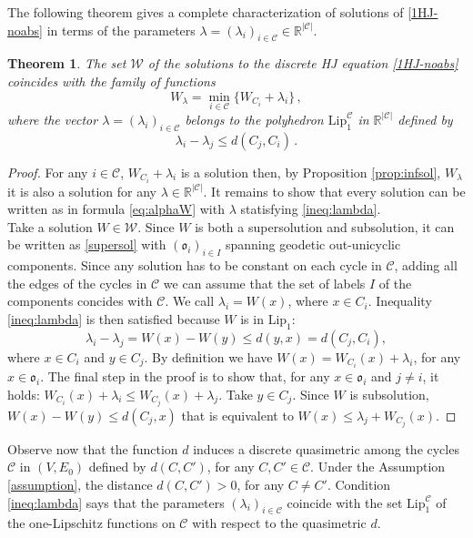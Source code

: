 \documentclass[reqno]{amsart}
\theoremstyle{plain}
\newtheorem{theorem}{Theorem}[section]
\theoremstyle{definition}
\theoremstyle{remark}
\numberwithin{equation}{section}
\numberwithin{theorem}{section}
\newcommand{\<}{\langle}
\renewcommand{\>}{\rangle}
\begin{document}
The following theorem gives a complete characterization of solutions of \eqref{1HJ-noabs} in terms of the parameters $\lambda=(\lambda_i)_{i\in \mathcal C}\in \mathbb R^{|\mathcal{C}|}$.
\begin{theorem}\label{teo:char_alpha}
	The set $\mathcal W$ of the solutions to the discrete HJ equation \eqref{1HJ-noabs} coincides with the family of functions 
	\begin{equation}\label{eq:alphaW}
		W_\lambda=\min_{i\in\mathcal{C}}\Big\{W_{C_i}+\lambda_i\Big\}\,, 
	\end{equation}
	where the vector $\lambda=(\lambda_i)_{i\in\mathcal{C}}$ belongs to the polyhedron $\mathrm{Lip}_1^{\mathcal{C}}$ in $\mathbb{R}^{|\mathcal{C}|}$ defined by
	\begin{equation}\label{ineq:lambda}
		\lambda_i-\lambda_j\leq d(C_j,C_i)\,.
	\end{equation}
\end{theorem}



\begin{proof} 
	For any $i\in\mathcal{C}$, $W_{C_i}+\lambda_i$ is a solution then, by Proposition \ref{prop:infsol}, $W_\lambda$ it is also a solution for any $\lambda\in\mathbb{R}^{|\mathcal{C}|}$. It remains to show that every solution can be written as in formula \eqref{eq:alphaW} with $\lambda$ statisfying \eqref{ineq:lambda}.\\
	
	Take a solution $W\in\mathcal{W}$. Since $W$ is both a supersolution and subsolution, it can be written as \eqref{supersol} with $(\mathfrak{o}_i)_{i\in I}$ spanning geodetic out-unicyclic components. Since any solution has to be constant on each cycle in $\mathcal C$, adding all the edges of the cycles in $\mathcal C$ we can assume that the set of labels $I$ of the components concides with $\mathcal C$. We call $\lambda_i = W (x)$, where $x\in C_i$. Inequality \eqref{ineq:lambda} is then satisfied because $W$ is in $\mathrm{Lip}_1$:
	\begin{equation*}
		\lambda_i-\lambda_j=W(x)-W(y)\leq d(y,x)=d(C_j,C_i),
	\end{equation*}
	where $x\in C_i$ and $y\in C_j$. By definition we have $W(x)=W_{C_i}(x)+\lambda_i$, for any $x\in\mathfrak{o}_i$. The final step in the proof is to show that,  for any $x\in\mathfrak{o}_i$ and $j\neq i$, it holds:
	$W_{C_i}(x)+\lambda_i\leq W_{C_j}(x)+\lambda_j$. Take $y\in C_j$. Since $W$ is subsolution, $W(x)-W(y)\leq d(C_j,x)$ that is equivalent to $W(x)\leq \lambda_j + W_{C_j}(x)$.
	
	
\end{proof}
Observe now that the function $d$ induces a discrete quasimetric among the cycles $\mathcal{C}$ in $(V,E_0)$ defined by $d(C,C')$, for any $C,C'\in\mathcal{C}$.  
Under the Assumption \ref{assumption}, the distance $d(C,C')>0$, for any $C\neq C'$. Condition \eqref{ineq:lambda} says that the parameters $(\lambda_i)_{i\in \mathcal C}$ coincide with the set $\mathrm{Lip}_1^{\mathcal C}$ of the one-Lipschitz functions on $\mathcal C$ with respect to the quasimetric $d$. 
\end{document}
